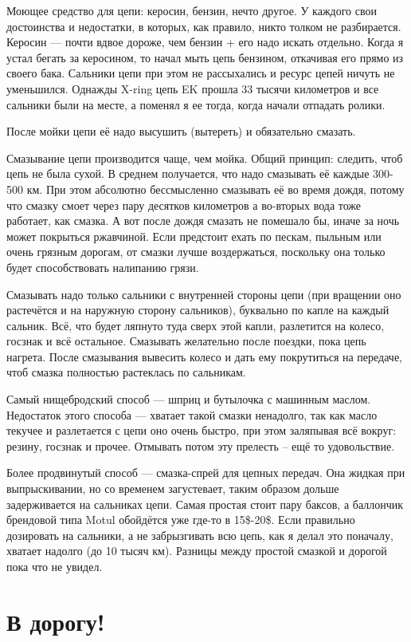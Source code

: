 \documentclass[12pt,a4paper]{article}
\begin{document}
Моющее средство для цепи: керосин, бензин, нечто другое. У каждого
свои достоинства и недостатки, в которых, как правило, никто толком
не разбирается. Керосин --- почти вдвое дороже, чем
бензин + его надо искать отдельно. Когда я устал бегать за керосином,
то начал мыть цепь бензином, откачивая его прямо из своего бака.
Сальники цепи при этом не рассыхались и ресурс цепей ничуть не
уменьшился. Однажды X-ring цепь EK прошла 33 тысячи километров и
все сальники были на месте, а поменял я ее тогда, когда начали
отпадать ролики.

После мойки цепи её надо высушить (вытереть) и обязательно смазать.

Смазывание цепи производится чаще, чем мойка. Общий принцип: следить,
чтоб цепь не была сухой. В среднем получается, что надо смазывать её
каждые 300-500 км. При этом абсолютно бессмысленно смазывать её во
время дождя, потому что смазку смоет через пару десятков километров а
во-вторых вода тоже работает, как смазка. А вот после дождя смазать
не помешало бы, иначе за ночь может покрыться ржавчиной. Если предстоит
ехать по пескам, пыльным или очень грязным дорогам, от смазки лучше
воздержаться, поскольку она только будет способствовать налипанию
грязи.

Смазывать надо только сальники с внутренней стороны
цепи (при вращении оно растечётся и на наружную сторону сальников),
буквально по капле на каждый сальник. Всё, что будет ляпнуто туда
сверх этой капли, разлетится на колесо, госзнак и всё остальное.
Смазывать желательно после поездки, пока цепь нагрета. После смазывания
вывесить колесо и дать ему покрутиться на передаче, чтоб смазка
полностью растеклась по сальникам.

Самый нищебродский способ --- шприц и бутылочка с машинным маслом.
Недостаток этого способа --- хватает такой смазки ненадолго, так как
масло текучее и разлетается с цепи оно очень быстро, при этом заляпывая
всё вокруг: резину, госзнак и прочее. Отмывать потом эту прелесть --
ещё то удовольствие.

Более продвинутый способ --- смазка-спрей для цепных передач. Она
жидкая при выпрыскивании, но со временем загустевает, таким образом
дольше задерживается на сальниках цепи. Самая простая стоит пару баксов,
а баллончик брендовой типа Motul обойдётся уже где-то в 15\$-20\$.
Если правильно дозировать на сальники, а не забрызгивать всю цепь,
как я делал это поначалу, хватает надолго (до 10 тысяч км). Разницы
между простой смазкой и дорогой пока что не увидел.

\section{В дорогу!}
\end{document}
